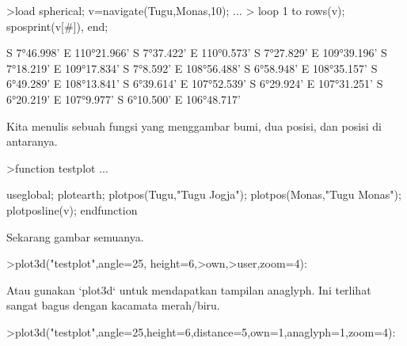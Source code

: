 \documentclass[12pt,arial,letterpaper]{book}
\begin{document}
\begin{eulercomment}
\begin{eulercomment}
\begin{eulercomment}
\begin{eulercomment}
\begin{eulercomment}
\begin{eulercomment}
\begin{eulercomment}
\begin{eulercomment}
\begin{eulercomment}
\begin{eulercomment}
\begin{eulercomment}
\begin{eulercomment}
\begin{eulercomment}
\begin{eulercomment}
\begin{eulercomment}
\begin{eulercomment}
\begin{eulercomment}
\begin{eulercomment}
\begin{eulercomment}
\begin{eulercomment}
\begin{eulercomment}
\begin{eulercomment}
\begin{eulercomment}
\begin{eulercomment}
\begin{eulercomment}
\begin{eulercomment}
\begin{eulercomment}
\begin{eulercomment}
\begin{eulercomment}
\begin{eulercomment}
\begin{eulercomment}
\end{eulercomment}
\begin{eulerprompt}
>load spherical; v=navigate(Tugu,Monas,10); ...
>  loop 1 to rows(v); sposprint(v[#]), end;
\end{eulerprompt}
\begin{euleroutput}
  S 7°46.998' E 110°21.966'
  S 7°37.422' E 110°0.573'
  S 7°27.829' E 109°39.196'
  S 7°18.219' E 109°17.834'
  S 7°8.592' E 108°56.488'
  S 6°58.948' E 108°35.157'
  S 6°49.289' E 108°13.841'
  S 6°39.614' E 107°52.539'
  S 6°29.924' E 107°31.251'
  S 6°20.219' E 107°9.977'
  S 6°10.500' E 106°48.717'
\end{euleroutput}
\begin{eulercomment}
Kita menulis sebuah fungsi yang menggambar bumi, dua posisi, dan
posisi di antaranya.
\end{eulercomment}
\begin{eulerprompt}
>function testplot ...
\end{eulerprompt}
\begin{eulerudf}
  useglobal;
  plotearth;
  plotpos(Tugu,"Tugu Jogja"); plotpos(Monas,"Tugu Monas");
  plotposline(v);
  endfunction
\end{eulerudf}
\begin{eulercomment}
Sekarang gambar semuanya.
\end{eulercomment}
\begin{eulerprompt}
>plot3d("testplot",angle=25, height=6,>own,>user,zoom=4):
\end{eulerprompt}
\begin{eulercomment}
Atau gunakan `plot3d` untuk mendapatkan tampilan anaglyph. Ini
terlihat sangat bagus dengan kacamata merah/biru.
\end{eulercomment}
\begin{eulerprompt}
>plot3d("testplot",angle=25,height=6,distance=5,own=1,anaglyph=1,zoom=4):
\end{eulerprompt}

\end{eulercomment}
\end{eulercomment}
\end{eulercomment}
\end{eulercomment}
\end{eulercomment}
\end{eulercomment}
\end{eulercomment}
\end{eulercomment}
\end{eulercomment}
\end{eulercomment}
\end{eulercomment}
\end{eulercomment}
\end{eulercomment}
\end{eulercomment}
\end{eulercomment}
\end{eulercomment}
\end{eulercomment}
\end{eulercomment}
\end{eulercomment}
\end{eulercomment}
\end{eulercomment}
\end{eulercomment}
\end{eulercomment}
\end{eulercomment}
\end{eulercomment}
\end{eulercomment}
\end{eulercomment}
\end{eulercomment}
\end{eulercomment}
\end{eulercomment}
\end{document}

